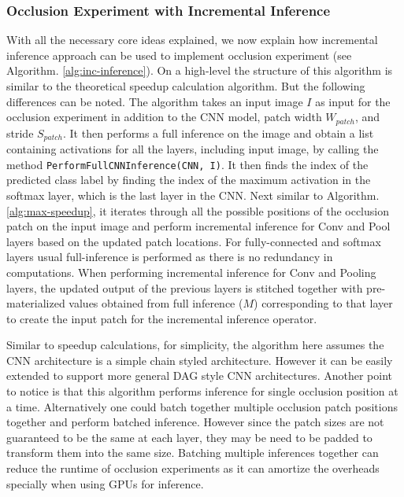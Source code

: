 \subsubsection{Occlusion Experiment with Incremental Inference}
With all the necessary core ideas explained, we now explain how incremental inference approach can be used to implement occlusion experiment (see Algorithm. \ref{alg:inc-inference}).
On a high-level the structure of this algorithm is similar to the theoretical speedup calculation algorithm. But the following differences can be noted. The algorithm takes an input image $I$ as input for the occlusion experiment in addition to the CNN model, patch width $W_{patch}$, and stride $S_{patch}$.
It then performs a full inference on the image and obtain a list containing activations for all the layers, including input image, by calling the method \texttt{PerformFullCNNInference(CNN, I)}.
It then finds the index of the predicted class label by finding the index of the maximum activation in the softmax layer, which is the last layer in the CNN.
Next similar to Algorithm. \ref{alg:max-speedup}, it iterates through all the possible positions of the occlusion patch on the input image and perform incremental inference for Conv and Pool layers based on the updated patch locations. For fully-connected and softmax layers usual full-inference is performed as there is no redundancy in computations.
When performing incremental inference for Conv and Pooling layers, the updated output of the previous layers is stitched together with pre-materialized values obtained from full inference ($M$) corresponding to that layer to create the input patch for the incremental inference operator.

Similar to speedup calculations, for simplicity, the algorithm here assumes the CNN architecture is a simple chain styled architecture. However it can be easily extended to support more general DAG style CNN architectures.
Another point to notice is that this algorithm performs inference for single occlusion position at a time. Alternatively one could batch together multiple occlusion patch positions together and perform batched inference. However since the patch sizes are not guaranteed to be the same at each layer, they may be need to be padded to transform them into the same size.
Batching multiple inferences together can reduce the runtime of occlusion experiments as it can amortize the overheads specially when using GPUs for inference.

